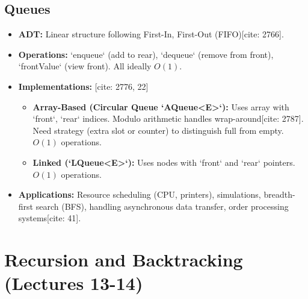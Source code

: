 \documentclass{article}
\begin{document}
\subsection{Queues}
\begin{itemize}
    \item \textbf{ADT:} Linear structure following First-In, First-Out (FIFO)[cite: 2766].
    \item \textbf{Operations:} `enqueue` (add to rear), `dequeue` (remove from front), `frontValue` (view front). All ideally $O(1)$.
    \item \textbf{Implementations:} [cite: 2776, 22]
          \begin{itemize}
              \item \textbf{Array-Based (Circular Queue `AQueue<E>`):} Uses array with `front`, `rear` indices. Modulo arithmetic handles wrap-around[cite: 2787]. Need strategy (extra slot or counter) to distinguish full from empty. $O(1)$ operations.
              \item \textbf{Linked (`LQueue<E>`):} Uses nodes with `front` and `rear` pointers. $O(1)$ operations.
          \end{itemize}
    \item \textbf{Applications:} Resource scheduling (CPU, printers), simulations, breadth-first search (BFS), handling asynchronous data transfer, order processing systems[cite: 41].
\end{itemize}

\section{Recursion and Backtracking (Lectures 13-14)}
\end{document}
